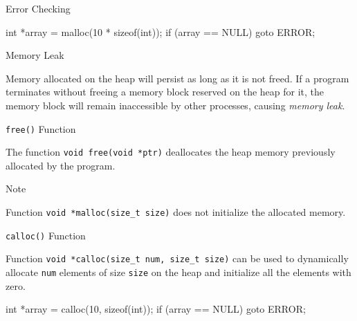 \documentclass[compress]{beamer}
\begin{document}
\begin{slide}
	\begin{block}{Error Checking}

	\begin{terminal}
	int *array = malloc(10 * sizeof(int));
	if (array == NULL)
		goto ERROR;
	\end{terminal}

	\end{block}
\end{slide}


\begin{slide}
	\begin{block}{Memory Leak}

	Memory allocated on the heap will persist as long as it is not freed.
	If a program terminates without freeing a memory block reserved on the heap for it, the memory block will remain inaccessible by other processes, causing \emph{memory leak}.

	\end{block}
\end{slide}

\begin{slide}
	\begin{block}{\texttt{free()} Function}

	The function \texttt{void free(void *ptr)} deallocates the heap memory previously allocated by the program.

	\end{block}
\end{slide}

\begin{slide}
	\begin{block}{Note}

	Function \texttt{void *malloc(size\_t size)} does not initialize the allocated memory.

	\end{block}
\end{slide}

\begin{slide}
	\begin{block}{\texttt{calloc()} Function}

	Function \texttt{void *calloc(size\_t num, size\_t size)} can be used to dynamically allocate \texttt{num} elements of size \texttt{size} on the heap and initialize all the elements with zero.

	\begin{terminal}
	int *array = calloc(10, sizeof(int));
	if (array == NULL)
		goto ERROR;
	\end{terminal}

	\end{block}
\end{slide}
\end{document}
